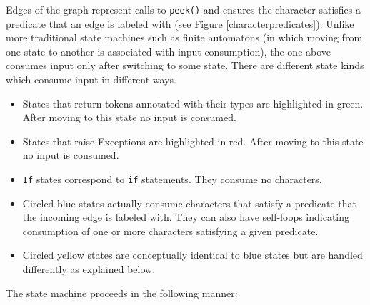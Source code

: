 \begin{itemize}
Edges of the graph represent calls to \texttt{peek()} and ensures the character satisfies a predicate that an edge is labeled with (see Figure \ref{characterpredicates}). Unlike more traditional state machines such as finite automatons (in which moving from one state to another is associated with input consumption), the one above consumes input only after switching to some state. There are different state kinds which consume input in different ways.
\begin{itemize}
\item States that return tokens annotated with their types are highlighted in green. After moving to this state no input is consumed.
\item States that raise Exceptions are highlighted in red. After moving to this state no input is consumed.
\item \texttt{If} states correspond to \texttt{if} statements. They consume no characters.
\item Circled blue states actually consume characters that satisfy a predicate that the incoming edge is labeled with. They can also have self-loops indicating consumption of one or more characters satisfying a given predicate.
\item Circled yellow states are conceptually identical to blue states but are handled differently as explained below.
\end{itemize}

The state machine proceeds in the following manner:


\end{itemize}
